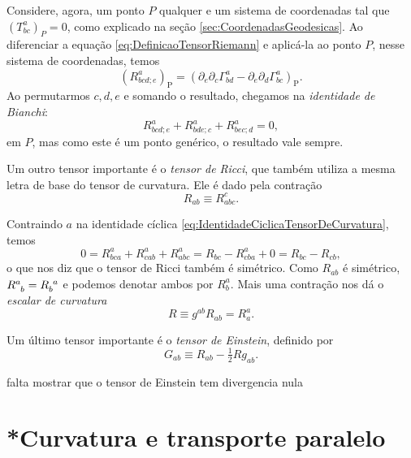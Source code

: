 Considere, agora, um ponto $P$ qualquer e um sistema de coordenadas tal que $(T^{a}_{bc})_P=0$, {\color{ForestGreen} como explicado na seção \ref{sec:CoordenadasGeodesicas}.} Ao diferenciar a equação \eqref{eq:DefinicaoTensorRiemann} e aplicá-la ao ponto $P$, nesse sistema de coordenadas, temos
\[
	\left(R_{b c d ; e}^{a}\right)_{\mathrm{P}}=\left(\partial_{e} \partial_{c} \Gamma_{b d}^{a}-\partial_{e} \partial_{d} \Gamma_{b c}^{a}\right)_{\mathrm{P}} .
\]
Ao permutarmos $c,d,e$ e somando o resultado, chegamos na \textit{identidade de Bianchi}:
\begin{equation}\label{eq:IdentidadeBianchi}
	R_{b c d ; e}^{a}+R_{b d e ; c}^{a}+R_{b e c ; d}^{a}=0,
\end{equation}
em $P$, mas como este é um ponto genérico, o resultado vale sempre.

Um outro tensor importante é o \textit{tensor de Ricci}, que também utiliza a mesma letra de base do tensor de curvatura. Ele é dado pela contração 
\begin{equation}\label{eq:TensorRicciDefinicao}
	\boxed{
	R_{ab} \equiv R^c_{abc} .
	}
\end{equation}

Contraindo $a$ na identidade cíclica \eqref{eq:IdentidadeCiclicaTensorDeCurvatura}, temos
\[
	0=R_{b c a}^{a}+R_{c a b}^{a}+R_{a b c}^{a}=R_{b c}-R_{c b a}^{a}+0=R_{b c}-R_{c b},
\]
o que nos diz que o tensor de Ricci também é simétrico. Como $R_{ab}$ é simétrico, $\tensor{R}{^a _b}=\tensor{R}{_b ^a}$ e podemos denotar ambos por $R^a_b$. Mais uma contração nos dá o \textit{escalar de curvatura}
\begin{equation}\label{eq:EscalarCurvaturaDefinicao}
	\boxed{
		R \equiv g^{ab}R_{ab}=R^a_a.
	}
\end{equation}

Um último tensor importante é o \textit{tensor de Einstein}, definido por
\begin{equation}
	\boxed{
		G_{ab} \equiv R_{ab} - \tfrac{1}{2}Rg_{ab} .
	}
\end{equation}

{\color{red} falta mostrar que o tensor de Einstein tem divergencia nula}






\section{*Curvatura e transporte paralelo}\label{sec:CurvaturaTransporteParalelo}


